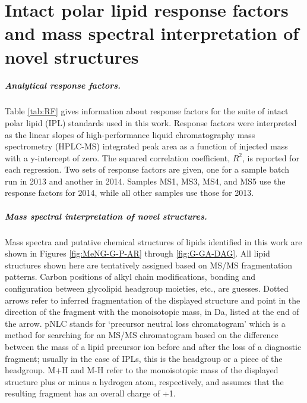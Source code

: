 \chapter{Intact polar lipid response factors and mass spectral interpretation of novel structures}\label{app1}

\doublespace

\paragraph*{Analytical response factors.} Table \ref{tab:RF} gives information about response factors for the suite of intact polar lipid (IPL) standards used in this work. Response factors were interpreted as the linear slopes of high-performance liquid chromatography mass spectrometry (HPLC-MS) integrated peak area as a function of injected mass with a y-intercept of zero. The squared correlation coefficient, $R^{2}$, is reported for each regression. Two sets of response factors are given, one for a sample batch run in 2013 and another in 2014. Samples MS1, MS3, MS4, and MS5 use the response factors for 2014, while all other samples use those for 2013.

\paragraph*{Mass spectral interpretation of novel structures.} Mass spectra and putative chemical structures of lipids identified in this work are shown in Figures \ref{fig:MeNG-G-P-AR} through \ref{fig:G-GA-DAG}. All lipid structures shown here are tentatively assigned based on MS/MS fragmentation patterns. Carbon positions of alkyl chain modifications, bonding and configuration between glycolipid headgroup moieties, etc., are guesses. Dotted arrows refer to inferred fragmentation of the displayed structure and point in the direction of the fragment with the monoisotopic mass, in Da, listed at the end of the arrow. pNLC stands for `precursor neutral loss chromatogram' which is a method for searching for an MS/MS chromatogram based on the difference between the mass of a lipid precursor ion before and after the loss of a diagnostic fragment; usually in the case of IPLs, this is the headgroup or a piece of the headgroup. M+H and M-H refer to the monoisotopic mass of the displayed structure plus or minus a hydrogen atom, respectively, and assumes that the resulting fragment has an overall charge of +1.

\clearpage


